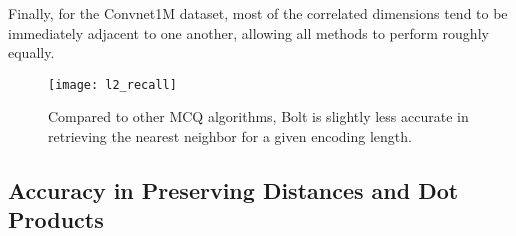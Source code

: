Finally, for the Convnet1M dataset, most of the correlated dimensions tend to be immediately adjacent to one another, allowing all methods to perform roughly equally.


\begin{figure}[h]
\begin{center}
\texttt{[image: l2\_recall]}
\caption{Compared to other MCQ algorithms, Bolt is slightly less accurate in retrieving the nearest neighbor for a given encoding length.}
\label{fig:nn_acc}
\end{center}
\end{figure}





\subsection{Accuracy in Preserving Distances and Dot Products}


